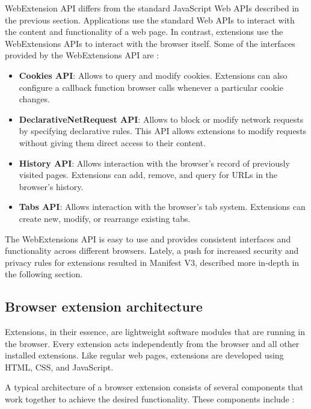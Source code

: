 WebExtension API differs from the standard JavaScript Web APIs described in the previous section. Applications use the standard Web APIs to interact with the content and functionality of a web page. In contrast, extensions use the WebExtensions APIs to interact with the browser itself. Some of the interfaces provided by the WebExtensions API are \cite{ChromeWebExtensions}:

\begin{itemize}
	\item \textbf{Cookies API}: Allows to query and modify cookies. Extensions can also configure a callback function browser calls whenever a particular cookie changes.
	\item \textbf{DeclarativeNetRequest API}: Allows to block or modify network requests by specifying declarative rules. This API allows extensions to modify requests without giving them direct access to their content.
	\item \textbf{History API}: Allows interaction with the browser's record of previously visited pages. Extensions can add, remove, and query for URLs in the browser's history.
	\item \textbf{Tabs API}: Allows interaction with the browser's tab system. Extensions can create new, modify, or rearrange existing tabs.
\end{itemize}

The WebExtensions API is easy to use and provides consistent interfaces and functionality across different browsers. Lately, a push for increased security and privacy rules for extensions resulted in Manifest V3, described more in-depth in the following section.

\subsection{Browser extension architecture}

Extensions, in their essence, are lightweight software modules that are running in the browser. Every extension acts independently from the browser and all other installed extensions. Like regular web pages, extensions are developed using HTML, CSS, and JavaScript.

A typical architecture of a browser extension consists of several components that work together to achieve the desired functionality. These components include \cite{ChromeWebExtensions}:

